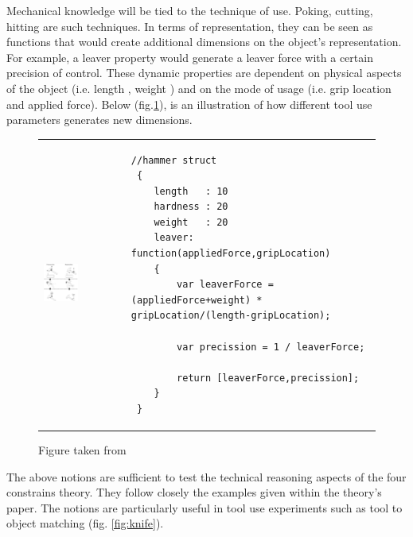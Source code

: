 \documentclass[11]{article}
\begin{document}
Mechanical knowledge will be tied to the technique of use. Poking, cutting, hitting are such techniques. In terms of representation, they can be seen as functions that would create additional dimensions on the object's representation. For example, a leaver property would generate a leaver force with a certain precision of control. These dynamic properties are dependent on physical aspects of the object (i.e. length , weight ) and on the mode of usage (i.e. grip location and applied force). Below (fig.\ref{fig:hammer}), is an illustration of how different tool use parameters generates new dimensions. 
\begin{figure}[h]
\centering
\begin{tabular}{p{} p{}}
  \vspace{0pt} \includegraphics[width=0.45\textwidth]{hammering.png} &
  \vspace{0pt} \begin{lstlisting}
//hammer struct
 { 
	length   : 10
	hardness : 20 
	weight   : 20 
	leaver: function(appliedForce,gripLocation)
	{
		var leaverForce = (appliedForce+weight) *  gripLocation/(length-gripLocation);
		
		var precission = 1 / leaverForce;

		return [leaverForce,precission];
	}
 }
  \end{lstlisting}
\end{tabular}
  
      \caption{  
   Figure taken from \cite{osiurak2014}
   }
   \label{fig:hammer}

\end{figure}

The above notions are sufficient to test the technical reasoning aspects of the four constrains theory. They follow closely the examples given within the theory's paper. The notions are particularly useful in tool use experiments such as tool to object matching (fig. \ref{fig:knife}).
\end{document}
